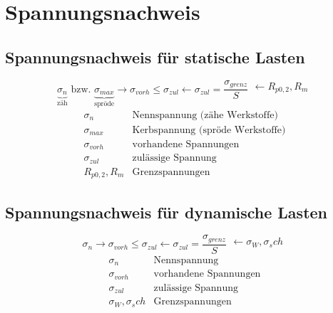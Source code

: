 



\section{Spannungsnachweis}

\subsection{Spannungsnachweis für statische Lasten}
\[ \underbrace{\sigma_n}_\text{zäh} \text{ bzw. } \underbrace{\sigma_{max}}_\text{spröde} \rightarrow \sigma_{vorh} \leq \sigma_{zul} \leftarrow \sigma_{zul} = \frac{\sigma_{grenz}}{S} \begin{matrix} \leftarrow R_{p0,2}, R_m\\~ \end{matrix} \]
\[ \begin{array}{ll}
\sigma_n & \text{Nennspannung (zähe Werkstoffe)}\\
\sigma_{max} & \text{Kerbspannung (spröde Werkstoffe)}\\
\sigma_{vorh} & \text{vorhandene Spannungen}\\
\sigma_{zul} & \text{zulässige Spannung}\\
R_{p0,2}, R_m & \text{Grenzspannungen}
\end{array} \]

\subsection{Spannungsnachweis für dynamische Lasten}
\[ \sigma_n  \rightarrow \sigma_{vorh} \leq \sigma_{zul} \leftarrow \sigma_{zul} = \frac{\sigma_{grenz}}{S} \begin{matrix} \leftarrow \sigma_W, \sigma_sch\\~ \end{matrix} \]
\[ \begin{array}{ll}
\sigma_n & \text{Nennspannung}\\
\sigma_{vorh} & \text{vorhandene Spannungen}\\
\sigma_{zul} & \text{zulässige Spannung}\\
\sigma_W, \sigma_sch & \text{Grenzspannungen}
\end{array} \]
